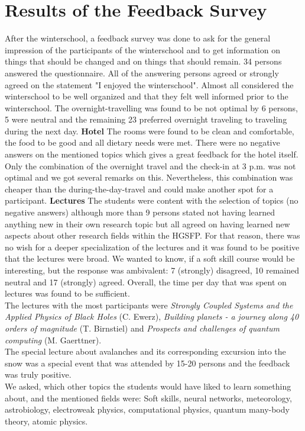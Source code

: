 \section{Results of the Feedback Survey}
After the winterschool, a feedback survey was done to ask for the general impression of the participants of the winterschool and to get information on things that should be changed and on things that should remain. 34 persons answered the questionnaire. All of the answering persons agreed or strongly agreed on the statement "I enjoyed the winterschool". Almost all considered the winterschool to be well organized and that they felt well informed prior to the winterschool. The overnight-travelling was found to be not optimal by 6 persons, 5 were neutral and the remaining 23 preferred overnight traveling to traveling during the next day. 
\textbf{Hotel}
The rooms were found to be clean and comfortable, the food to be good and all dietary needs were met. There were no negative answers on the mentioned topics which gives a great feedback for the hotel itself. Only the combination of the overnight travel and the check-in at 3 p.m. was not optimal and we got several remarks on this. Nevertheless, this combination was cheaper than the during-the-day-travel and could make another spot for a participant.
\textbf{Lectures}
The students were content with the selection of topics (no negative answers) although more than 9 persons stated not having learned anything new in their own research topic but all agreed on having learned new aspects about other research fields within the HGSFP. For that reason, there was no wish for a deeper specialization of the lectures and it was found to be positive that the lectures were broad. We wanted to know, if a soft skill course would be interesting, but the response was ambivalent: 7 (strongly) disagreed, 10 remained neutral and 17 (strongly) agreed. Overall, the time per day that was spent on lectures was found to be sufficient.\\
The lectures with the most participants were \textit{Strongly Coupled Systems and the Applied Physics of Black Holes} (C. Ewerz), \textit{Building planets - a journey along 40 orders of magnitude} (T. Birnstiel) and \textit{Prospects and challenges of quantum computing} (M. Gaerttner).\\
The special lecture about avalanches and its corresponding excursion into the snow was a special event that was attended by 15-20 persons and the feedback was truly positive.\\
We asked, which other topics the students would have liked to learn something about, and the mentioned fields were: Soft skills, neural networks, meteorology, astrobiology, electroweak physics, computational physics, quantum many-body theory, atomic physics. 
